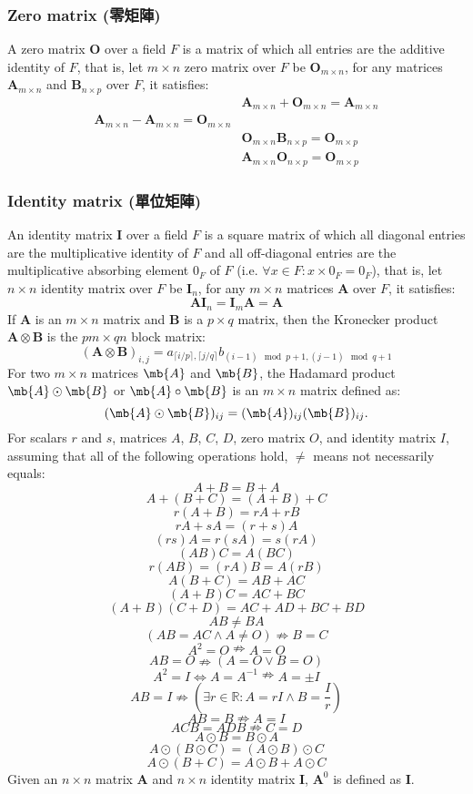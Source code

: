 \documentclass[a4paper,12pt]{report}
\begin{document}
\subsubsection{Zero matrix (零矩陣)}
A zero matrix $\mathbf{O}$ over a field $F$ is a matrix of which all entries are the additive identity of $F$, that is, let $m\times n$ zero matrix over $F$ be $\mathbf{O}_{m\times n}$, for any matrices $\mathbf{A}_{m\times n}$ and $\mathbf{B}_{n\times p}$ over $F$, it satisfies:
\[\begin{aligned}
&\mathbf{A}_{m\times n}+\mathbf{O}_{m\times n}=\mathbf{A}_{m\times n}\\
\mathbf{A}_{m\times n}-\mathbf{A}_{m\times n}=\mathbf{O}_{m\times n}\\
&\mathbf{O}_{m\times n}\mathbf{B}_{n\times p}=\mathbf{O}_{m\times p}\\
&\mathbf{A}_{m\times n}\mathbf{O}_{n\times p}=\mathbf{O}_{m\times p}
\end{aligned}\]
\subsubsection{Identity matrix (單位矩陣)}
An identity matrix $\mathbf{I}$ over a field $F$ is a square matrix of which all diagonal entries are the multiplicative identity of $F$ and all off-diagonal entries are the multiplicative absorbing element $0_F$ of $F$ (i.e. $\forall x\in F\colon x\times 0_F=0_F$), that is, let $n\times n$ identity matrix over $F$ be $\mathbf{I}_n$, for any $m\times n$ matrices $\mathbf{A}$ over $F$, it satisfies:
\[\mathbf{A}\mathbf{I}_n=\mathbf{I}_m\mathbf{A}=\mathbf{A}\]
If $\mathbf{A}$ is an $m\times n$ matrix and $\mathbf{B}$ is a $p\times q$ matrix, then the Kronecker product $\mathbf{A}\otimes\mathbf{B}$ is the $pm\times qn$ block matrix:
\[(\mathbf{A}\otimes\mathbf{B})_{i,j}=a_{\lceil i/p\rceil ,\lceil j/q\rceil }b_{(i-1)\mod p+1,(j-1)\mod q+1}\]
For two $m\times n$ matrices $\mb{A}$ and $\mb{B}$, the Hadamard product $ \mb{A}\odot \mb{B}$ or $\mb{A}\circ \mb{B}$ is an $m\times n$ matrix defined as:
\[(\mb{A}\odot \mb{B})_{ij}=(\mb{A})_{ij}(\mb{B})_{ij}.\]
For scalars $r$ and $s$, matrices $A$, $B$, $C$, $D$, zero matrix $O$, and identity matrix $I$, assuming that all of the following operations hold, $\neq$ means not necessarily equals:
\[A+B=B+A\]
\[A+(B+C)=(A+B)+C\]
\[r(A+B)=rA+rB\]
\[rA+sA=(r+s)A\]
\[(rs)A=r(sA)=s(rA)\]
\[(AB)C=A(BC)\]
\[r(AB)=(rA)B=A(rB)\]
\[A(B+C)=AB+AC\]
\[(A+B)C=AC+BC\]
\[(A+B)(C+D)=AC+AD+BC+BD\]
\[AB\neq BA\]
\[(AB=AC\land A\neq O)\nRightarrow B=C\]
\[A^2=O\nRightarrow A=O\]
\[AB=O\nRightarrow(A=O\lor B=O)\]
\[A^2=I\iff A=A^{-1}\nRightarrow A=\pm I\]
\[AB=I\nRightarrow(\exists r\in\mathbb{R}\colon A=rI\land B=\frac{I}{r})\]
\[AB=B\nRightarrow A=I\]
\[ACB=ADB\nRightarrow C=D\]
\[A\odot B=B\odot A\]
\[A\odot(B\odot C)=(A\odot B)\odot C\]
\[A\odot(B+C)=A\odot B+A\odot C\]
Given an $n\times n$ matrix $\mathbf{A}$ and $n\times n$ identity matrix $\mathbf{I}$, $\mathbf{A}^0$ is defined as $\mathbf{I}$.
\end{document}
